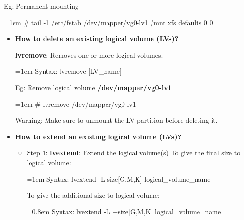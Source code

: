 \begin{flushleft}
\begin{itemize}
	Eg: Permanent mounting
	\begin{tcolorbox}[breakable,notitle,boxrule=-0pt,colback=black,colframe=black]
		\color{green}
		\font=1em
		\# tail -1 /etc/fstab
		\color{white}
		\newline
		/dev/mapper/vg0-lv1  /mnt xfs defaults 0 0
		\font=4pt
	\end{tcolorbox}
\end{itemize}	
	\bigskip
	\bigskip
	\begin{itemize}

	\item 	\textbf{How to delete an existing logical volume (LVs)?}
	
	\textbf{lvremove}: Removes one or more logical volumes.
	\begin{tcolorbox}[breakable,notitle,boxrule=-0pt,colback=pink,colframe=pink]
		\color{black}
		\font=1em
		Syntax: lvremove [LV\_name]
		\font=4pt
	\end{tcolorbox}
	
	Eg: Remove logical volume \textbf{/dev/mapper/vg0-lv1}
	\begin{tcolorbox}[breakable,notitle,boxrule=-0pt,colback=black,colframe=black]
		\color{green}
		\font=1em
		\# lvremove /dev/mapper/vg0-lv1
		\font=4pt
	\end{tcolorbox}
	\bigskip
	\begin{tcolorbox}[breakable,notitle,boxrule=-0pt,colback=red,colframe=red]
		\color{white}
		Warning: Make sure to unmount the LV partition before deleting it.
	\end{tcolorbox}
	
	
	\bigskip
	\bigskip
	\item  \textbf{How to extend an existing logical volume (LVs)?}

	\begin{itemize}
		\item Step 1:
		\newline
			\textbf{lvextend}: Extend the logical volume(s)
			\newline
			To give the final size to logical volume:
			\begin{tcolorbox}[breakable,notitle,boxrule=-0pt,colback=pink,colframe=pink]
				\color{black}
				\font=1em
				Syntax: lvextend -L size[G,M,K] logical\_volume\_name
				\font=4pt
			\end{tcolorbox}
			
			To give the additional size to logical volume:
			\begin{tcolorbox}[breakable,notitle,boxrule=-0pt,colback=pink,colframe=pink]
				\color{black}
				\font=0.8em
				Syntax: lvextend -L +size[G,M,K] logical\_volume\_name
				\font=4pt
			\end{tcolorbox}
			

\end{itemize}
\end{itemize}
\end{flushleft}

